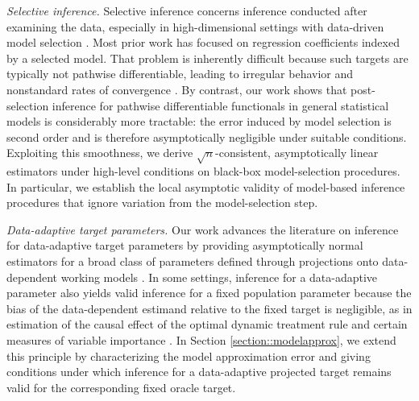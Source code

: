 \documentclass[11pt]{article}
\theoremstyle{definition}
\begin{document}
\textit{Selective inference.} Selective inference concerns inference conducted after examining the data, especially in high-dimensional settings with data-driven model selection \citep{modelselectionbias, zhang2014confidence, lee2016exact, zhao2017selective, danielleWittenLassoWorks, PostselectionInference}. Most prior work has focused on regression coefficients indexed by a selected model. That problem is inherently difficult because such targets are typically not pathwise differentiable, leading to irregular behavior and nonstandard rates of convergence \citep{potscherAdaptLasso2009distribution, adaptLassoBadPerf, cai2017confidence, yang2021rates}. By contrast, our work shows that post-selection inference for pathwise differentiable functionals in general statistical models is considerably more tractable: the error induced by model selection is second order and is therefore asymptotically negligible under suitable conditions. Exploiting this smoothness, we derive \(\sqrt{n}\)-consistent, asymptotically linear estimators under high-level conditions on black-box model-selection procedures. In particular, we establish the local asymptotic validity of model-based inference procedures that ignore variation from the model-selection step.


 \textit{Data-adaptive target parameters.} Our work advances the literature on inference for data-adaptive target parameters by providing asymptotically normal estimators for a broad class of parameters defined through projections onto data-dependent working models \citep{van2013AdaptTarget, dataAdaptTargetParam, aronow2016data, rinaldo2019bootstrapping}. In some settings, inference for a data-adaptive parameter also yields valid inference for a fixed population parameter because the bias of the data-dependent estimand relative to the fixed target is negligible, as in estimation of the causal effect of the optimal dynamic treatment rule \citep{van2015OptRule} and certain measures of variable importance \citep{williamson2021nonparametric}. In Section \ref{section::modelapprox}, we extend this principle by characterizing the model approximation error and giving conditions under which inference for a data-adaptive projected target remains valid for the corresponding fixed oracle target.


 
 
\end{document}
